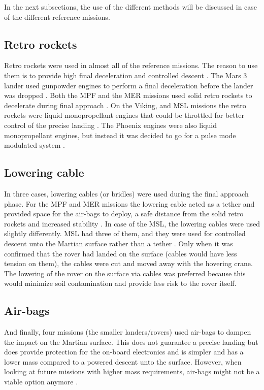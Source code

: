 In the next subsections, the use of the different methods will be discussed in case of the different reference missions.

\subsection{Retro rockets}
\label{subsec:retrock}
Retro rockets were used in almost all of the reference missions. The reason to use them is to provide high final deceleration and controlled descent \cite{mooij2013para}. The Mars 3 lander used gunpowder engines to perform a final deceleration before the lander was dropped \cite{perminov1999}. Both the \ac{MPF} and the MER missions used solid retro rockets to decelerate during final approach \cite{pathfinder_jpl1997,bonnefond2006}.
On the Viking, and \ac{MSL} missions the retro rockets were liquid monopropellant engines that could be throttled for better control of the precise landing \cite{way2007,soffen1977}. The Phoenix engines were also liquid monopropellant engines, but instead it was decided to go for a pulse mode modulated system \cite{mcallister2009}.

\subsection{Lowering cable}
\label{subsec:lowcab}
In three cases, lowering cables (or bridles) were used during the final approach phase. For the \ac{MPF} and MER missions the lowering cable acted as a tether and provided space for the air-bags to deploy, a safe distance from the solid retro rockets and increased stability \cite{pathfinder_jpl1997}.
In case of the \ac{MSL}, the lowering cables were used slightly differently. \ac{MSL} had three of them, and they were used for controlled descent unto the Martian surface rather than a tether \cite{way2007}. Only when it was confirmed that the rover had landed on the surface (cables would have less tension on them), the cables were cut and moved away with the hovering crane. The lowering of the rover on the surface via cables was preferred because this would minimize soil contamination and provide less risk to the rover itself. 

\subsection{Air-bags}
\label{subsec:airbags}
And finally, four missions (the smaller landers/rovers) used air-bags to dampen the impact on the Martian surface. This does not guarantee a precise landing but does provide protection for the on-board electronics and is simpler and has a lower mass compared to a powered descent unto the surface. However, when looking at future missions with higher mass requirements, air-bags might not be a viable option anymore \cite{mppg2012}.

